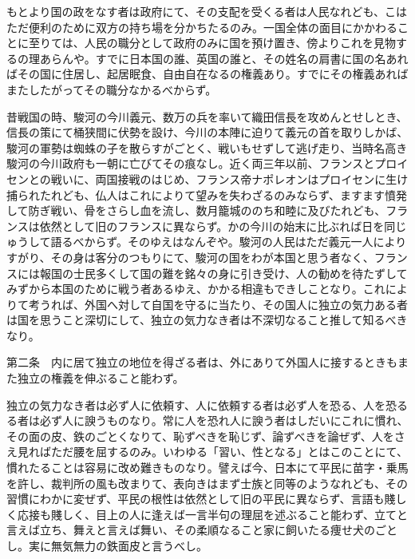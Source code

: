 \documentclass[a4paper, platex, dvipdfmx]{jsarticle}
\begin{document}
もとより国の政をなす者は政府にて、その支配を受くる者は人民なれども、こはただ便利のために双方の持ち場を分かちたるのみ。一国全体の面目にかかわることに至りては、人民の職分として政府のみに国を預け置き、傍よりこれを見物するの理あらんや。すでに日本国の誰、英国の誰と、その姓名の肩書に国の名あればその国に住居し、起居眠食、自由自在なるの権義あり。すでにその権義あればまたしたがってその職分なかるべからず。

昔戦国の時、駿河の今川義元、数万の兵を率いて織田信長を攻めんとせしとき、信長の策にて桶狭間に伏勢を設け、今川の本陣に迫りて義元の首を取りしかば、駿河の軍勢は蜘蛛の子を散らすがごとく、戦いもせずして逃げ走り、当時名高き駿河の今川政府も一朝に亡びてその痕なし。近く両三年以前、フランスとプロイセンとの戦いに、両国接戦のはじめ、フランス帝ナポレオンはプロイセンに生け捕られたれども、仏人はこれによりて望みを失わざるのみならず、ますます憤発して防ぎ戦い、骨をさらし血を流し、数月籠城ののち和睦に及びたれども、フランスは依然として旧のフランスに異ならず。かの今川の始末に比ぶれば日を同じゅうして語るべからず。そのゆえはなんぞや。駿河の人民はただ義元一人によりすがり、その身は客分のつもりにて、駿河の国をわが本国と思う者なく、フランスには報国の士民多くして国の難を銘々の身に引き受け、人の勧めを待たずしてみずから本国のために戦う者あるゆえ、かかる相違もできしことなり。これによりて考うれば、外国へ対して自国を守るに当たり、その国人に独立の気力ある者は国を思うこと深切にして、独立の気力なき者は不深切なること推して知るべきなり。

第二条　内に居て独立の地位を得ざる者は、外にありて外国人に接するときもまた独立の権義を伸ぶること能わず。

独立の気力なき者は必ず人に依頼す、人に依頼する者は必ず人を恐る、人を恐るる者は必ず人に諛うものなり。常に人を恐れ人に諛う者はしだいにこれに慣れ、その面の皮、鉄のごとくなりて、恥ずべきを恥じず、論ずべきを論ぜず、人をさえ見ればただ腰を屈するのみ。いわゆる「習い、性となる」とはこのことにて、慣れたることは容易に改め難きものなり。譬えば今、日本にて平民に苗字・乗馬を許し、裁判所の風も改まりて、表向きはまず士族と同等のようなれども、その習慣にわかに変ぜず、平民の根性は依然として旧の平民に異ならず、言語も賤しく応接も賤しく、目上の人に逢えば一言半句の理屈を述ぶること能わず、立てと言えば立ち、舞えと言えば舞い、その柔順なること家に飼いたる痩せ犬のごとし。実に無気無力の鉄面皮と言うべし。
\end{document}
